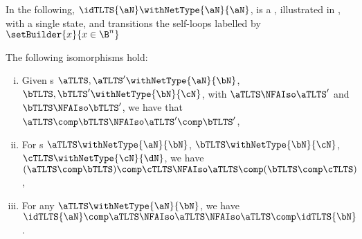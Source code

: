 In the following, $\idTLTS{\aN} \withNetType{\aN}{\aN}$, is a \TLTS{},
illustrated in , with a single state, and transitions the
self-loops labelled by $\setBuilder{x}{x \in \B^n}$

\begin{proposition}\label{prop:TLTSCatAxioms}
    The following isomorphisms hold:
    \begin{enumerate}[(i)]
        \item \label{seq-item1} Given \TLTS{}s $\aTLTS, \aTLTS'
            \withNetType{\aN}{\bN}$, $\bTLTS, \bTLTS' \withNetType{\bN}{\cN}$,
            with $\aTLTS \NFAIso \aTLTS'$ and $\bTLTS \NFAIso \bTLTS'$, we have
            that $\aTLTS \comp \bTLTS \NFAIso \aTLTS' \comp \bTLTS'$,
        \item \label{seq-item2} For \TLTS{}s $\aTLTS \withNetType{\aN}{\bN}$,
            $\bTLTS \withNetType{\bN}{\cN}$, $\cTLTS \withNetType{\cN}{\dN}$,
            we have $(\aTLTS \comp \bTLTS) \comp \cTLTS \NFAIso \aTLTS \comp
            (\bTLTS \comp \cTLTS)$,
        \item \label{seq-item3} For any \TLTS{} $\aTLTS
            \withNetType{\aN}{\bN}$, we have $\idTLTS{\aN} \comp \aTLTS \NFAIso
            \aTLTS \NFAIso \aTLTS \comp \idTLTS{\bN}$.
    \end{enumerate}
\end{proposition}
